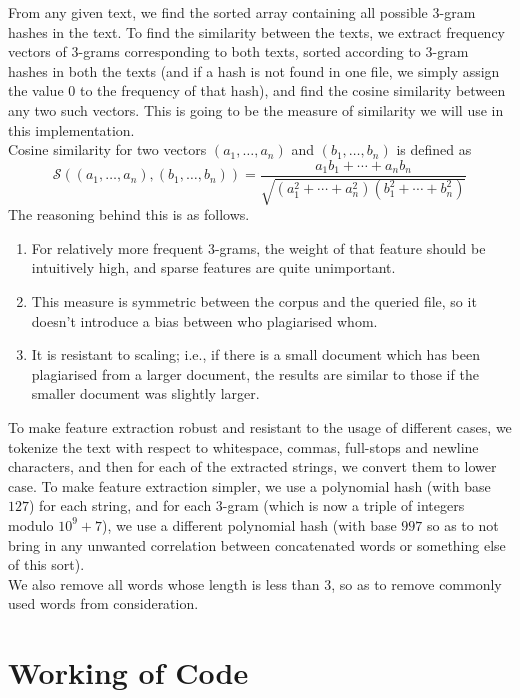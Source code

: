 \documentclass{article}
\begin{document}
From any given text, we find the sorted array containing all possible $3$-gram hashes in the text. To find the similarity between the texts, we extract frequency vectors of $3$-grams corresponding to both texts, sorted according to $3$-gram hashes in both the texts (and if a hash is not found in one file, we simply assign the value 0 to the frequency of that hash), and find the cosine similarity between any two such vectors. This is going to be the measure of similarity we will use in this implementation.\\
Cosine similarity for two vectors $(a_1, \dots, a_n)$ and $(b_1, \dots, b_n)$ is defined as $$\mathcal{S}((a_1, \dots, a_n), (b_1, \dots, b_n)) = \frac{a_1b_1 + \cdots + a_nb_n}{\sqrt{(a_1^2 + \cdots + a_n^2)(b_1^2 + \cdots + b_n^2)}}$$
The reasoning behind this is as follows.
\begin{enumerate}
        \item For relatively more frequent $3$-grams, the weight of that feature should be intuitively high, and sparse features are quite unimportant.
        \item This measure is symmetric between the corpus and the queried file, so it doesn't introduce a bias between who plagiarised whom.
        \item It is resistant to scaling; i.e., if there is a small document which has been plagiarised from a larger document, the results are similar to those if the smaller document was slightly larger.
\end{enumerate}
To make feature extraction robust and resistant to the usage of different cases, we tokenize the text with respect to whitespace, commas, full-stops and newline characters, and then for each of the extracted strings, we convert them to lower case.
To make feature extraction simpler, we use a polynomial hash (with base $127$) for each string, and for each $3$-gram (which is now a triple of integers modulo $10^9 + 7$), we use a different polynomial hash (with base $997$ so as to not bring in any unwanted correlation between concatenated words or something else of this sort).\\
We also remove all words whose length is less than 3, so as to remove commonly used words from consideration.

\section*{Working of Code}
\end{document}
